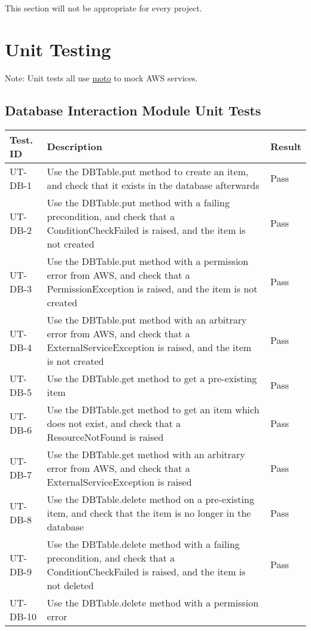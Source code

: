 \documentclass[12pt, titlepage]{article}
\begin{document}
This section will not be appropriate for every project.

\section{Unit Testing}

Note: Unit tests all use \href{https://pypi.org/project/moto/}{moto}
to mock AWS services.

\subsection{Database Interaction Module Unit Tests}

\begin{longtable}{|m{2cm}|m{10cm}|m{1.4cm}|}
  \hline
  \textbf{Test. ID} & \textbf{Description} & \textbf{Result} \\ \hline
  UT-DB-1 & Use the DBTable.put method to create an item, and check
  that it exists in the database afterwards & Pass\\ \hline
  UT-DB-2 & Use the DBTable.put method with a failing precondition,
  and check that a ConditionCheckFailed is raised, and the item is
  not created & Pass\\ \hline
  UT-DB-3 & Use the DBTable.put method with a permission error from
  AWS, and check that a PermissionException is raised, and the item
  is not created & Pass\\ \hline
  UT-DB-4 & Use the DBTable.put method with an arbitrary error from
  AWS, and check that a ExternalServiceException is raised, and the
  item is not created & Pass\\ \hline
  UT-DB-5 & Use the DBTable.get method to get a pre-existing item &
  Pass\\ \hline
  UT-DB-6 & Use the DBTable.get method to get an item which does not
  exist, and check that a ResourceNotFound is raised & Pass\\ \hline
  UT-DB-7 & Use the DBTable.get method with an arbitrary error from
  AWS, and check that a ExternalServiceException is raised & Pass\\ \hline
  UT-DB-8 & Use the DBTable.delete method on a pre-existing item, and
  check that the item is no longer in the database & Pass\\ \hline
  UT-DB-9 & Use the DBTable.delete method with a failing
  precondition, and check that a ConditionCheckFailed is raised, and
  the item is not deleted & Pass\\ \hline
  UT-DB-10 & Use the DBTable.delete method with a permission error

\end{longtable}
\end{document}
